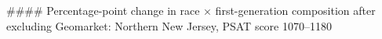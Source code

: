 #### Percentage-point change in race × first-generation composition after excluding Geomarket: Northern New Jersey, PSAT score 1070–1180
